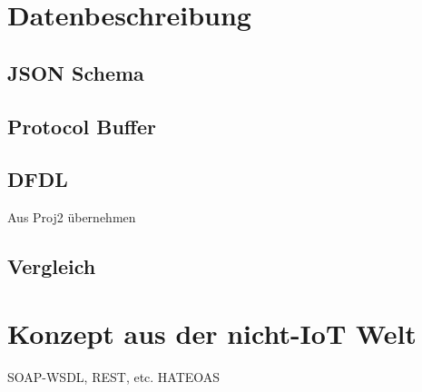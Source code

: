 \section{Datenbeschreibung}

\subsection{JSON Schema}

\subsection{Protocol Buffer}

\subsection{DFDL}
Aus Proj2 übernehmen

\subsection{Vergleich}






\section{Konzept aus der nicht-IoT Welt}
SOAP-WSDL, REST, etc.
HATEOAS
